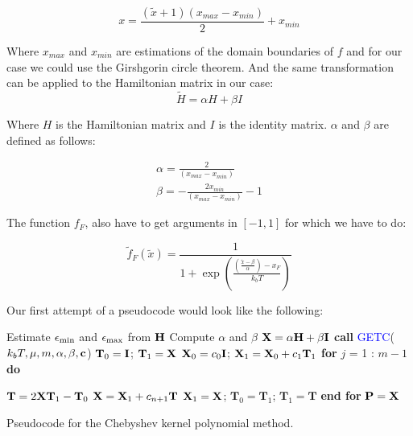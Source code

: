 \begin{equation}
  x = \frac{(\tilde{x} + 1)(x_{max}-x_{min})}{2}  + x_{min}
  \label{x}
\end{equation}


Where $x_{max}$ and $x_{min}$ are estimations of the domain boundaries of $f$ and for our case we could use the Girshgorin circle theorem. And the same transformation can be applied to the Hamiltonian matrix in our case: 
\begin{equation}
  \tilde{H} = \alpha H  +  \beta I
\end{equation}

Where $H$ is the Hamiltonian matrix and $I$ is the identity matrix. $\alpha$ and $\beta$ are defined as follows: 

\begin{equation}
  \begin{array}{ccc}    
  \alpha = \frac{2}{(x_{max}-x_{min})} \\
  \beta = - \frac{2x_{min}}{(x_{max}-x_{min})} - 1
  \end{array}
\end{equation}

The function $f_F$, also have to get arguments in $[-1,1]$ for which we have to do: 

\begin{equation}
  \tilde{f}_F(\tilde{x})= \frac{1}{1+\exp(\frac{(\frac{\tilde{x} - \beta}{\alpha})-x_F}{k_bT})}
  \label{Fermi}
\end{equation}

Our first attempt of a pseudocode would look like the following:  

\begin{algorithm}[H]
  \algrenewcommand{}
  \begin{algorithmic}
    \parskip 0.05cm
    {\fontsize{0.3cm}{0.3em}\selectfont 
      \State Estimate $\epsilon_{\mathrm{min}}$ and $\epsilon_{\mathrm{max}}$ from $\textbf{H}$
      \State Compute $\alpha$ and $\beta$      
      \State $\textbf{X} = \alpha\textbf{H} + \beta \textbf{I}$
      \State \textbf{call} \textcolor{blue}{GETC}($k_bT,\mu,m,\alpha,\beta,\textbf{c}$) 
      \State $\textbf{T}_0 = \textbf{I}$; $\textbf{T}_1 = \textbf{X}$
      \State $\textbf{X}_0 = c_0\textbf{I}$; $\textbf{X}_1 = \textbf{X}_0 + c_1\textbf{T}_1 $
      \State \textbf{for} $j$ = 1 : $m-1$ \textbf{do}
      
      \State \qquad \textcolor{red}{$\textbf{T} = 2\textbf{X}\textbf{T}_1 - \textbf{T}_{0}$}
      \State \qquad $\textbf{X} = \textbf{X}_1 + c_{n+1}\textbf{T}$
      \State \qquad $\textbf{X}_1 = \textbf{X}$; $\textbf{T}_{0} = \textbf{T}_{1}$; $\textbf{T}_{1} = \textbf{T}$  
      \State \textbf{end for}
      \State $\textbf{P} = \textbf{X}$
      \EndFunction
    }       
  \end{algorithmic}
  \label{pcode}
  \caption{Pseudocode for the Chebyshev kernel polynomial method.}
\end{algorithm}

